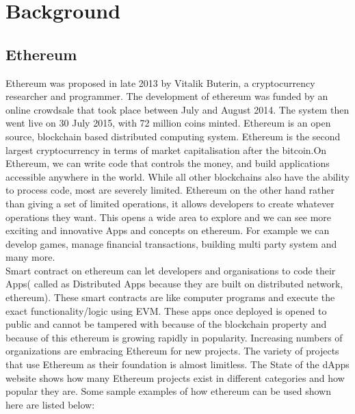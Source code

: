 \chapter{Background}
\label{ch:bcg}
\section{Ethereum}
Ethereum was proposed in late 2013 by Vitalik Buterin, a cryptocurrency researcher and programmer. The development of ethereum was funded by an online crowdsale that took place between July and August 2014. The system then went live on 30 July 2015, with 72 million coins minted\cite{eth1reum}. Ethereum is an open source, blockchain based distributed computing system. Ethereum is the second largest cryptocurrency in terms of market capitalisation after the bitcoin.On Ethereum, we can write code that controls the money, and build applications accessible anywhere in the world. While all other blockchains also have the ability to process code, most are severely limited. Ethereum on the other hand rather than giving a set of limited operations, it allows developers to create whatever operations they want. This opens a wide area to explore and we can see more exciting and innovative Apps and concepts on ethereum. For example we can develop games, manage financial transactions, building multi party system and many more. 
\\ 
Smart contract on ethereum can let developers and organisations to code their Apps( called as Distributed Apps because they are built on distributed network, ethereum). These smart contracts are like computer programs and execute the exact functionality/logic using EVM. These apps once deployed is opened to public and cannot be tampered with because of the blockchain property and because of this ethereum is growing rapidly in popularity. Increasing numbers of organizations are embracing Ethereum for new projects. The variety of projects that use Ethereum as their foundation is almost limitless. 
The State of the dApps website\cite{sdapp} shows how many Ethereum projects exist in different categories and how popular they are. Some sample examples of how ethereum can be used shown here\cite{dummies} are listed below:\\
